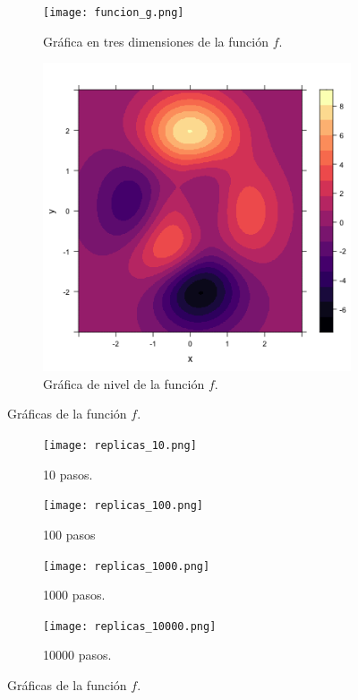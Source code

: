 \documentclass[12pt,letterpaper]{article}
\begin{document}
 \begin{figure}
 	\centering
 	\begin{subfigure}[b]{0.45\linewidth}
 		\texttt{[image: funcion\_g.png]}
 		 \caption{Gráfica en tres dimensiones de la función $f$.}
 		\label{3d}
 	\end{subfigure}
 	\begin{subfigure}[b]{0.45\linewidth}
 		\includegraphics[width=\linewidth]{grafica.png}
 		 \caption{Gráfica de nivel de la función $f$.}
 		\label{levelplot}
 	\end{subfigure}
 	\caption{Gráficas de la función $f$.}  	
\label{graficas}
 \end{figure}
 
  \begin{figure}
 	\centering
 	\begin{subfigure}[b]{0.45\linewidth}
 		\texttt{[image: replicas\_10.png]}
 		 \caption{10 pasos.}
 		\label{levelplot0}
 	\end{subfigure}
 	\begin{subfigure}[b]{0.45\linewidth}
 		\texttt{[image: replicas\_100.png]}
 		 \caption{100 pasos}
 		\label{levelplot1}
 	\end{subfigure}
  	\begin{subfigure}[b]{0.45\linewidth}
 		\texttt{[image: replicas\_1000.png]}
 		 \caption{1000 pasos.}
 		\label{levelplot1}
 	\end{subfigure}
  	\begin{subfigure}[b]{0.45\linewidth}
 		\texttt{[image: replicas\_10000.png]}
 		 \caption{10000 pasos.}
 		\label{levelplot2}
 	\end{subfigure}
 	\caption{Gráficas de la función $f$.}  	
\label{pasos}
 \end{figure}
 
\end{document}
